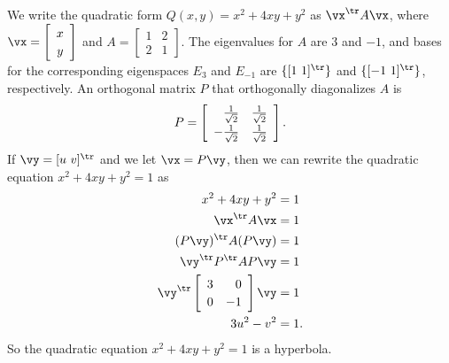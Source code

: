 \begin{example}
	\item We write the quadratic form $Q(x,y)=x^2+4xy+y^2$ as $\vx^{\tr} A \vx$, where $\vx = \left[ \begin{array}{c} x\\y \end{array} \right]$ and $A = \left[  \begin{array}{cc} 1&2\\2&1 \end{array} \right]$. The eigenvalues for $A$ are $3$ and $-1$, and bases for the corresponding eigenspaces $E_3$ and $E_{-1}$ are $\{[1 \ 1]^{\tr}\}$ and $\{[-1 \ 1]^{\tr}\}$, respectively. An orthogonal matrix $P$ that orthogonally diagonalizes $A$ is 
\[P = \left[\renewcommand{\arraystretch}{1.2} \begin{array}{rc} \frac{1}{\sqrt{2}}&\frac{1}{\sqrt{2}} \\ -\frac{1}{\sqrt{2}}&\frac{1}{\sqrt{2}}  \end{array} \right].\]
If $\vy =  [u \ v]^{\tr}$ and we let $\vx = P\vy$, then we can rewrite the quadratic equation $x^2+4xy+y^2 = 1$ as 
\begin{align*}
x^2+4xy+y^2 &= 1 \\
\vx^{\tr}A\vx &= 1 \\
(P\vy)^{\tr}A(P\vy) &= 1 \\
\vy^{\tr} P^{\tr}AP \vy &= 1 \\
\vy^{\tr} \left[ \begin{array}{cr} 3&0\\0&-1 \end{array} \right] \vy &= 1 \\
3u^2-v^2 &= 1.
\end{align*}
So the quadratic equation $x^2+4xy+y^2=1$ is a hyperbola.  
 

\end{example}

